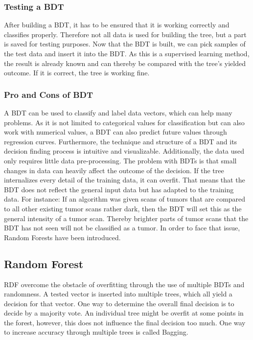 \documentclass[
12pt,
headsepline,
bibliography=totoc,
twoside=semi,
]{scrartcl}
\begin{document}
 \subsubsection{Testing a BDT\label{sec:sec2-1-4}}
 After building a BDT, it has to be ensured that it is working correctly and classifies properly. Therefore not all data is used for building the tree, but a part is saved for testing purposes. Now that the BDT is built, we can pick samples of the test data and insert it into the BDT. As this is a supervised learning method, the result is already known and can thereby be compared with the tree's yielded outcome. If it is correct, the tree is working fine.  

 \subsubsection{Pro and Cons of BDT\label{sec:sec2-1-5}}
 A BDT can be used to classify and label data vectors, which can help many problems. As it is not limited to categorical values for classification but can also work with numerical values, a BDT can also predict future values through regression curves. Furthermore, the technique and structure of a BDT and its decision finding process is intuitive and visualizable. Additionally, the data used only requires little data pre-processing. The problem with BDTs is that small changes in data can heavily affect the outcome of the decision. If the tree internalizes every detail of the training data, it can overfit. That means that the BDT does not reflect the general input data but has adapted to the training data. For instance: If an algorithm was given scans of tumors that are compared to all other existing tumor scans rather dark, then the BDT will set this as the general intensity of a tumor scan. Thereby brighter parts of tumor scans that the BDT has not seen will not be classified as a tumor. In order to face that issue, Random Forests have been introduced. 

 \subsection{Random Forest\label{sec:sec2-2}}
   RDF overcome the obstacle of overfitting through the use of multiple BDTs and randomness. A tested vector is inserted into multiple trees, which all yield a decision for that vector. One way to determine the overall final decision is to decide by a majority vote. An individual tree might be overfit at some points in the forest, however, this does not influence the final decision too much. One way to increase accuracy through multiple trees is called Bagging.
\end{document}
